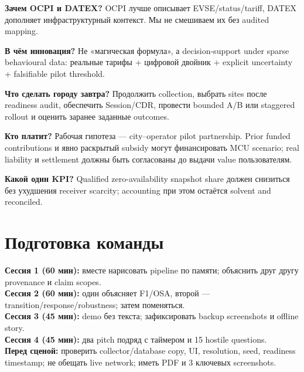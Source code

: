 \documentclass[11pt,a4paper]{article}
\begin{document}
\textbf{Зачем OCPI и DATEX?} OCPI лучше описывает EVSE/status/tariff, DATEX дополняет инфраструктурный контекст. Мы не смешиваем их без audited mapping.

\textbf{В чём инновация?} Не «магическая формула», а decision-support under sparse behavioural data: реальные тарифы + цифровой двойник + explicit uncertainty + falsifiable pilot threshold.

\textbf{Что сделать городу завтра?} Продолжить collection, выбрать sites после readiness audit, обеспечить Session/CDR, провести bounded A/B или staggered rollout и оценить заранее заданные outcomes.

\textbf{Кто платит?} Рабочая гипотеза --- city--operator pilot partnership. Prior funded contributions и явно раскрытый subsidy могут финансировать MCU scenario; real liability и settlement должны быть согласованы до выдачи value пользователям.

\textbf{Какой один KPI?} Qualified zero-availability snapshot share должен снизиться без ухудшения receiver scarcity; accounting при этом остаётся solvent and reconciled.

\section{Подготовка команды}
\textbf{Сессия 1 (60 мин):} вместе нарисовать pipeline по памяти; объяснить друг другу provenance и claim scopes.\\
\textbf{Сессия 2 (60 мин):} один объясняет F1/OSA, второй --- transition/response/robustness; затем поменяться.\\
\textbf{Сессия 3 (45 мин):} demo без текста; зафиксировать backup screenshots и offline story.\\
\textbf{Сессия 4 (45 мин):} два pitch подряд с таймером и 15 hostile questions.\\
\textbf{Перед сценой:} проверить collector/database copy, UI, resolution, seed, readiness timestamp; не обещать live network; иметь PDF и 3 ключевых screenshots.
\end{document}
